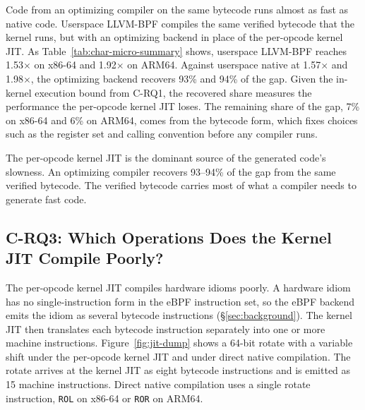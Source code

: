 Code from an optimizing compiler on the same bytecode runs almost as fast as native code.
Userspace LLVM-BPF compiles the same verified bytecode that the kernel runs, but with an optimizing backend in place of the per-opcode kernel JIT.
As Table~\ref{tab:char-micro-summary} shows, userspace LLVM-BPF reaches 1.53$\times$ on x86-64 and 1.92$\times$ on ARM64.
Against userspace native at 1.57$\times$ and 1.98$\times$, the optimizing backend recovers 93\% and 94\% of the gap.
Given the in-kernel execution bound from C-RQ1, the recovered share measures the performance the per-opcode kernel JIT loses.
The remaining share of the gap, 7\% on x86-64 and 6\% on ARM64, comes from the bytecode form, which fixes choices such as the register set and calling convention before any compiler runs.

\begin{finding}
\finlabel The per-opcode kernel JIT is the dominant source of the generated code's slowness. An optimizing compiler recovers 93--94\% of the gap from the same verified bytecode. The verified bytecode carries most of what a compiler needs to generate fast code.
\end{finding}

\subsection{C-RQ3: Which Operations Does the Kernel JIT Compile Poorly?}
\label{subsec:char-idiom}

The per-opcode kernel JIT compiles hardware idioms poorly.
A hardware idiom has no single-instruction form in the eBPF instruction set, so the eBPF backend emits the idiom as several bytecode instructions (\S\ref{sec:background}).
The kernel JIT then translates each bytecode instruction separately into one or more machine instructions.
Figure~\ref{fig:jit-dump} shows a 64-bit rotate with a variable shift under the per-opcode kernel JIT and under direct native compilation.
The rotate arrives at the kernel JIT as eight bytecode instructions and is emitted as 15 machine instructions.
Direct native compilation uses a single rotate instruction, \texttt{ROL} on x86-64 or \texttt{ROR} on ARM64.


